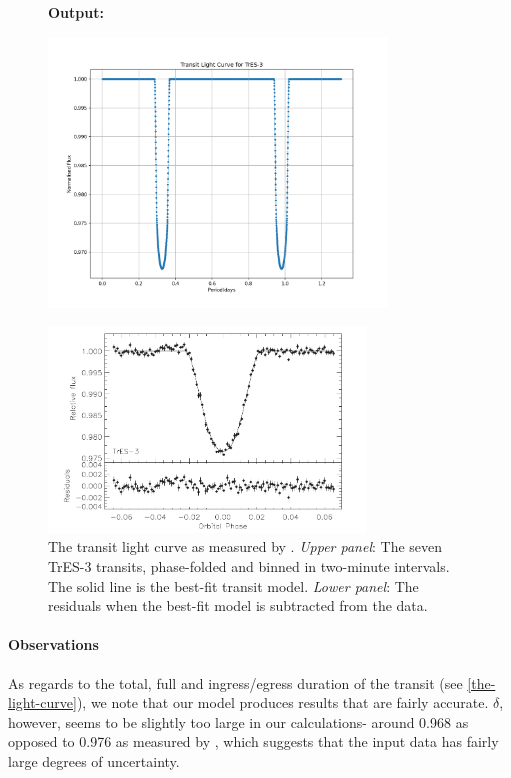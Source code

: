 \documentclass[11pt]{article}
\newcommand*{\figuretitle}[1]{
    	{\textbf{#1}
    	\par\vspace{-1em}}
    }
\begin{document}
    
\begin{figure}
	\figuretitle{Output:}
	\centering
	\includegraphics[width=0.8\textwidth]{../matplotlib_graphs/transit_2.png}
\end{figure} 

\begin{figure}
	\centering
	\includegraphics[width=0.75\textwidth]{../images/TrE-S_light_curve.png}
	\caption{The transit light curve as measured by \citeauthor{Chris} \parencite*{Chris}. {\it Upper panel}: The seven TrES-3 transits, phase-folded and binned in two-minute intervals. The solid line is the best-fit transit model. {\it Lower panel}: The residuals when the best-fit model is subtracted from the data.} 
	\label{Figure 4.c}
\end{figure}


    \hypertarget{observations}{%
\paragraph{Observations}\label{observations_3}}

As regards to the total, full and ingress/egress duration of the transit
(see \ref{the-light-curve}), we note that our model produces results that are fairly accurate. \(\delta\), however, seems to be slightly too large in our calculations- around 0.968 as opposed to 0.976 as measured by \cite{Chris}, which suggests that the input data has fairly large degrees of uncertainty.
\end{document}
